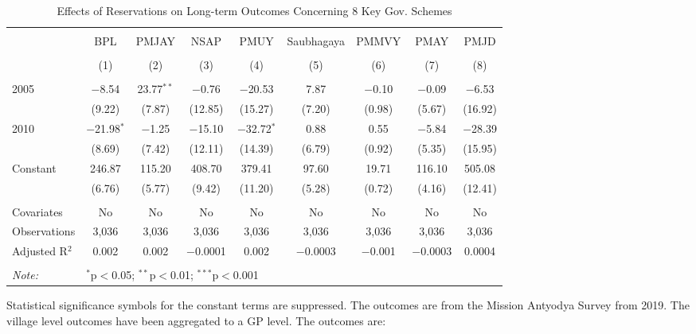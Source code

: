 \begin{table}[!htbp]
\centering
\begin{threeparttable}

  \caption{Effects of Reservations on Long-term Outcomes Concerning 8 Key Gov. Schemes} 
  \label{raj_shrug_schemes_05_10} 
\scriptsize 
\begin{tabular}{@{\extracolsep{0pt}}lcccccccc} 
\\[-1.8ex]\hline 
\hline \\[-1.8ex] 
 & BPL & PMJAY & NSAP & PMUY & Saubhagaya & PMMVY & PMAY & PMJD \\ 
\\[-1.8ex] & (1) & (2) & (3) & (4) & (5) & (6) & (7) & (8)\\ 
\hline \\[-1.8ex] 
 2005 & $-$8.54 & 23.77$^{**}$ & $-$0.76 & $-$20.53 & 7.87 & $-$0.10 & $-$0.09 & $-$6.53 \\ 
  & (9.22) & (7.87) & (12.85) & (15.27) & (7.20) & (0.98) & (5.67) & (16.92) \\ 
  2010 & $-$21.98$^{*}$ & $-$1.25 & $-$15.10 & $-$32.72$^{*}$ & 0.88 & 0.55 & $-$5.84 & $-$28.39 \\ 
  & (8.69) & (7.42) & (12.11) & (14.39) & (6.79) & (0.92) & (5.35) & (15.95) \\ 
  Constant & 246.87 & 115.20 & 408.70 & 379.41 & 97.60 & 19.71 & 116.10 & 505.08 \\ 
  & (6.76) & (5.77) & (9.42) & (11.20) & (5.28) & (0.72) & (4.16) & (12.41) \\ 
 \hline \\[-1.8ex] 
Covariates & No & No & No & No & No & No & No & No \\ 
Observations & 3,036 & 3,036 & 3,036 & 3,036 & 3,036 & 3,036 & 3,036 & 3,036 \\ 
Adjusted R$^{2}$ & 0.002 & 0.002 & $-$0.0001 & 0.002 & $-$0.0003 & $-$0.001 & $-$0.0003 & 0.0004 \\ 
\hline 
\hline \\[-1.8ex] 
\textit{Note:}  & \multicolumn{8}{l}{$^{*}$p$<$0.05; $^{**}$p$<$0.01; $^{***}$p$<$0.001} \\ 
\end{tabular} 
\begin{tablenotes}[flushleft]
\scriptsize
\item[] Statistical significance symbols for the constant terms are suppressed. The outcomes are from the Mission Antyodya Survey from 2019.
                   The village level outcomes have been aggregated to a GP level. The outcomes are:

\end{tablenotes}
\end{threeparttable}
\end{table}
